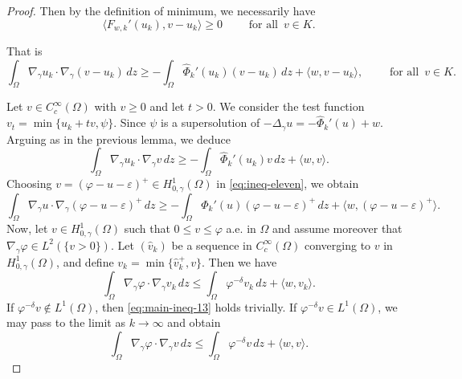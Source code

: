 \documentclass[11pt]{article}
\newcommand{\om} {\Omega}
\newcommand{\gradgr}{\nabla_{\gamma}}
\newcommand{\spacegr}{H^{1}_{0,\gamma}(\Omega)}
\begin{document}
\begin{proof}
Then by the definition of minimum, we necessarily have
\begin{equation*}
\langle F_{w,k}'(u_k), v - u_k \rangle \ge 0
\qquad
\text{ for all }\, v \in K .
\end{equation*}

That is
\begin{equation*}
\int_\Omega
\gradgr u_k \cdot \gradgr (v-u_k)\,dz
\ge
-
\int_\Omega
\widehat{\Phi}_k'(u_k)(v-u_k)\,dz
+
\langle w , v-u_k \rangle,
\qquad
\text{ for all }\, v \in K .
\end{equation*}

Let $v \in C_c^\infty(\Omega)$ with $v \ge 0$ and let $t > 0$. We consider the test function $v_t = \min\{ u_k + t v , \psi \}$. Since $\psi$ is a supersolution of $-\Delta_{\gamma} u = -\widehat{\Phi}_k'(u) + w$. Arguing as in the previous lemma, we deduce
\begin{equation}
\label{eq:ineq-eleven}
\int_\Omega
\gradgr u_k \cdot \gradgr v\,dz
\ge
-
\int_\Omega
\widehat{\Phi}_k'(u_k) v\,dz
+
\langle w , v \rangle .
\end{equation}
Choosing $v = (\varphi - u - \varepsilon)^+ \in \spacegr$ in \eqref{eq:ineq-eleven}, we obtain
\begin{equation*}\label{eq:ineq_eleven1}
\int_\Omega
\gradgr u \cdot \gradgr (\varphi - u - \varepsilon)^+ \, dz
\ge
-
\int_\Omega
\Phi_k'(u) (\varphi - u - \varepsilon)^+ \, dz
+
\langle w , (\varphi - u - \varepsilon)^+ \rangle .
\end{equation*}
Now, let $v \in \spacegr$ such that $0 \le v \le \varphi$ a.e. in $\om$ and assume moreover that $\gradgr \varphi \in L^2(\{ v > 0 \})$. Let $(\hat v_k)$ be a sequence in $C_c^\infty(\Omega)$ converging to $v$ in $\spacegr$, and define $v_k = \min\{ \hat v_k^{+}, v \}$. Then we have
\begin{equation*}
\int_\Omega
\gradgr \varphi \cdot \gradgr v_k \, dz
\le
\int_\Omega
\varphi^{-\delta} v_k \, dz
+
\langle w , v_k \rangle .
\end{equation*}
If $\varphi^{-\delta} v \notin L^1(\Omega)$, then \eqref{eq:main-ineq-13} holds trivially. If $\varphi^{-\delta} v \in L^1(\Omega)$, we may pass to the limit as
$k \to \infty$ and obtain
\begin{equation}
\label{eq:main-ineq-13}
\int_\Omega
\gradgr \varphi \cdot \gradgr v \, dz
\le
\int_\Omega
\varphi^{-\delta} v \, dz
+
\langle w , v \rangle .
\end{equation}

\end{proof}
\end{document}
